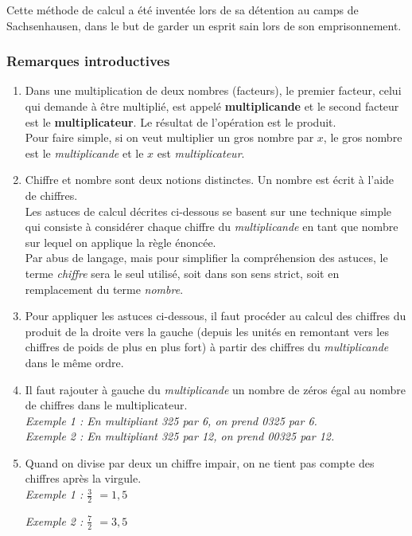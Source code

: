 \documentclass[a4paper]{article}
\begin{document}
Cette méthode de calcul a été inventée lors de sa détention au camps de Sachsenhausen, dans le but de garder un esprit sain lors de son emprisonnement.


\vfill


\subsubsection*{Remarques introductives}

\begin{enumerate}

\item Dans une multiplication de deux nombres (facteurs), le premier facteur, celui qui demande à être multiplié, est appelé \textbf{multiplicande} et le second facteur est le \textbf{multiplicateur}. Le résultat de l'opération est le produit.\\
Pour faire simple, si on veut multiplier un gros nombre par $x$, le gros nombre est le \textit{multiplicande} et le $x$ est \textit{multiplicateur}.\\

\item Chiffre et nombre sont deux notions distinctes. Un nombre est écrit à l'aide de chiffres.\\
Les astuces de calcul décrites ci-dessous se basent sur une technique simple qui consiste à considérer chaque chiffre du \textit{multiplicande} en tant que nombre sur lequel on applique la règle énoncée.\\
Par abus de langage, mais pour simplifier la compréhension des astuces, le terme \textit{chiffre} sera le seul utilisé, soit dans son sens strict, soit en remplacement du terme \textit{nombre}.\\

\item Pour appliquer les astuces ci-dessous, il faut procéder au calcul des chiffres du produit de la droite vers la gauche (depuis les unités en remontant vers les chiffres de poids de plus en plus fort) à partir des chiffres du \textit{multiplicande} dans le même ordre.\\

\item Il faut rajouter à gauche du \textit{multiplicande} un nombre de zéros égal au nombre de chiffres dans le multiplicateur.\\
\textit{Exemple 1 : En multipliant 325 par 6, on prend 0325 par 6.}\\
\textit{Exemple 2 : En multipliant 325 par 12, on prend 00325 par 12.}\\

\item Quand on divise par deux un chiffre impair, on ne tient pas compte des chiffres après la virgule.\\
\textit{Exemple 1 : {\Large $\frac{3}{2}$} $= 1$\sout{$,5$}}

\textit{Exemple 2 : {\Large $\frac{7}{2}$} $= 3$\sout{$,5$}}

\end{enumerate}
\end{document}

